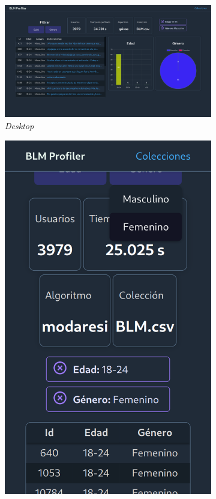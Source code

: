 \begin{figure}[H]
  \centering
  \begin{subfigure}{0.7\textwidth}
   \includegraphics[width=\textwidth]{imaxes/capturas-app/desktop/dashboard-perfilado-edad-genero.png}
  \caption{\textit{Desktop}} 
  \end{subfigure}
  \begin{subfigure}{0.223\textwidth}
   \includegraphics[width=\textwidth]{imaxes/capturas-app/mobile/dashboard-filtrado-edad-genero.png}

\end{subfigure}
\end{figure}
